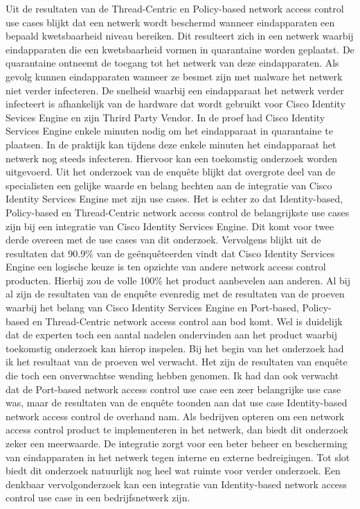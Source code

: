 Uit de resultaten van de Thread-Centric en Policy-based network access control use cases blijkt dat een netwerk wordt beschermd wanneer eindapparaten een bepaald kwetsbaarheid niveau bereiken. Dit resulteert zich in een netwerk waarbij eindapparaten die een kwetsbaarheid vormen in quarantaine worden geplaatst. De quarantaine ontneemt de toegang tot het netwerk van deze eindapparaten. Als gevolg kunnen eindapparaten wanneer ze besmet zijn met malware het netwerk niet verder infecteren. 
\newline
\newline
De snelheid waarbij een eindapparaat het netwerk verder infecteert is afhankelijk van de hardware dat wordt gebruikt voor Cisco Identity Sevices Engine en zijn Thrird Party Vendor. In de proef had Cisco Identity Services Engine enkele minuten nodig om het eindapparaat in quarantaine te plaatsen. In de praktijk kan tijdens deze enkele minuten het eindapparaat het netwerk nog steeds infecteren. Hiervoor kan een toekomstig onderzoek worden uitgevoerd.
\newline
\newline
Uit het onderzoek van de enquête blijkt dat overgrote deel van de specialisten een gelijke waarde en belang hechten aan de integratie van Cisco Identity Services Engine met zijn use cases. Het is echter zo dat Identity-based, Policy-based en Thread-Centric network access control de belangrijkste use cases zijn bij een integratie van Cisco Identity Services Engine. Dit komt voor twee derde overeen met de use cases van dit onderzoek. Vervolgens blijkt uit de resultaten dat 90.9\% van de geënquêteerden vindt dat Cisco Identity Services Engine een logische keuze is ten opzichte van andere network access control producten. Hierbij zou de volle 100\% het product aanbevelen aan anderen. Al bij al zijn de resultaten van de enquête evenredig met de resultaten van de proeven waarbij het belang van Cisco Identity Services Engine en Port-based, Policy-based en Thread-Centric network access control aan bod komt. Wel is duidelijk dat de experten toch een aantal nadelen ondervinden aan het product waarbij toekomstig onderzoek kan hierop inspelen. 
\newline
\newline
Bij het begin van het onderzoek had ik het resultaat van de proeven wel verwacht. Het zijn de resultaten van enquête die toch een onverwachtse wending hebben genomen. Ik had dan ook verwacht dat de Port-based network access control use case een zeer belangrijke use case was, maar de resultaten van de enquête toonden aan dat use case Identity-based network access control de overhand nam. 
\newline
\newline
Als bedrijven opteren om een network access control product te implementeren in het netwerk, dan biedt dit onderzoek zeker een meerwaarde. De integratie zorgt voor een beter beheer en bescherming van eindapparaten in het netwerk tegen interne en externe bedreigingen.  
\newline
\newline
Tot slot biedt dit onderzoek natuurlijk nog heel wat ruimte voor verder onderzoek. Een denkbaar vervolgonderzoek kan een integratie van Identity-based network access control use case in een bedrijfsnetwerk zijn.

  
